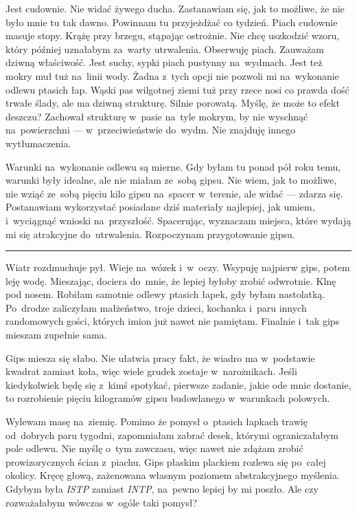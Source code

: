\documentclass[9pt, a5paper]{memoir}
\begin{document}
Jest cudownie. Nie widać żywego ducha. Zastanawiam się, jak to możliwe, że nie było mnie tu tak dawno. Powinnam tu przyjeżdżać co tydzień. Piach cudownie masuje stopy. Krążę przy brzegu, stąpając ostrożnie. Nie chcę uszkodzić wzoru, który później uznałabym za~warty utrwalenia. Obserwuję piach. Zauważam dziwną właściwość. Jest suchy, sypki piach pustynny na~wydmach. Jest też mokry muł tuż na~linii wody. Żadna z~tych opcji nie pozwoli mi na~wykonanie odlewu ptasich łap. Wąski pas wilgotnej ziemi tuż przy rzece nosi co prawda dość trwałe ślady, ale ma dziwną strukturę. Silnie porowatą. Myślę, że może to efekt deszczu? Zachował strukturę w~pasie na~tyle mokrym, by nie wyschnąć na~powierzchni --- w~przeciwieństwie do~wydm. Nie znajduję innego wytłumaczenia.

Warunki na~wykonanie odlewu są mierne. Gdy byłam tu ponad pół roku temu, warunki były idealne, ale nie miałam ze~sobą gipsu. Nie wiem, jak to możliwe, nie wziąć ze~sobą pięciu kilo gipsu na~spacer w~terenie, ale widać --- zdarza się. Postanawiam wykorzystać posiadane dziś materiały najlepiej, jak umiem, i~wyciągnąć wnioski na~przyszłość. Spacerując, wyznaczam miejsca, które wydają mi się atrakcyjne do~utrwalenia. Rozpoczynam przygotowanie gipsu.


\fancybreak{* \quad * \quad *}

Wiatr rozdmuchuje pył. Wieje na~wózek i~w~oczy. Wsypuję najpierw gips, potem leję wodę. Mieszając, dociera do~mnie, że lepiej byłoby zrobić odwrotnie. Klnę pod nosem. Robiłam samotnie odlewy ptasich łapek, gdy byłam nastolatką. Po~drodze zaliczyłam małżeństwo, troje dzieci, kochanka i~paru innych randomowych gości, których imion już nawet nie pamiętam. Finalnie i~tak gips mieszam zupełnie sama.

Gips miesza się słabo. Nie ułatwia pracy fakt, że wiadro ma w~podstawie kwadrat zamiast koła, więc wiele grudek zostaje w~narożnikach. Jeśli kiedykolwiek będę się z~kimś spotykać, pierwsze zadanie, jakie ode mnie dostanie, to rozrobienie pięciu kilogramów gipsu budowlanego w~warunkach polowych.

Wylewam masę na~ziemię. Pomimo że pomysł o~ptasich łapkach trawię od~dobrych paru tygodni, zapomniałam zabrać desek, którymi ograniczałabym pole odlewu. Nie myślę o~tym zawczasu, więc nawet nie zdążam zrobić prowizorycznych ścian z~piachu. Gips płaskim plackiem rozlewa się po~całej okolicy. Kręcę głową, zażenowana własnym poziomem abstrakcyjnego myślenia. Gdybym była \textit{ISTP} zamiast \textit{INTP}, na~pewno lepiej by mi poszło. Ale czy rozważałabym wówczas w~ogóle taki pomysł?
\end{document}
